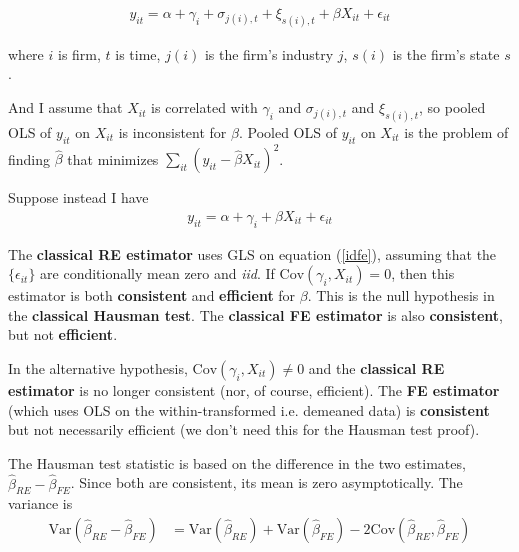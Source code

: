\documentclass[11pt,english]{article}
\begin{document}
	
	
	
\begin{align}
	y_{it} = \alpha + \gamma_i + \sigma_{j(i),t} + \xi_{s(i),t} + \beta X_{it} + \epsilon_{it}
\end{align}
	
where $i$ is firm, $t$ is time, $j(i)$ is the firm's industry $j$, $s(i)$ is the firm's state $s$. 	

And I assume that $X_{it}$ is correlated with $\gamma_i$ and $\sigma_{j(i),t}$ and $\xi_{s(i),t}$, so pooled OLS of $y_{it}$ on $X_{it}$ is inconsistent for $\beta$. Pooled OLS of $y_{it}$ on $X_{it}$ is the problem of finding $\hat{\beta}$ that minimizes $\sum_{it} (y_{it} - \hat{\beta} X_{it})^2$. 

Suppose instead I have
\begin{align}
	y_{it} = \alpha + \gamma_i + \beta X_{it}  + \epsilon_{it} \label{idfe}
\end{align}
	
The \textbf{classical RE estimator} uses GLS on equation (\ref{idfe}), assuming that the $\{ \epsilon_{it} \}$ are conditionally mean zero and \textit{iid}. If $\text{Cov}(\gamma_i ,X_{it}) = 0$, then this estimator is both \textbf{consistent} and \textbf{efficient} for $\beta$. This is the null hypothesis in the \textbf{classical Hausman test}. The \textbf{classical FE estimator} is also \textbf{consistent}, but not \textbf{efficient}. 

In the alternative hypothesis, $\text{Cov}(\gamma_i, X_{it}) \ne 0$ and the \textbf{classical RE estimator} is no longer consistent (nor, of course, efficient). The \textbf{FE estimator} (which uses OLS on the within-transformed i.e. demeaned data) is \textbf{consistent} but not necessarily efficient (we don't need this for the Hausman test proof). 

The Hausman test statistic is based on the difference in the two estimates, $\hat{\beta}_{RE} - \hat{\beta}_{FE}$. Since both are consistent, its mean is zero asymptotically. The variance is 
\begin{align}
	\text{Var}(\hat{\beta}_{RE} - \hat{\beta}_{FE}) &= \text{Var}(\hat{\beta}_{RE}) + \text{Var}(\hat{\beta}_{FE}) - 2\text{Cov}(\hat{\beta}_{RE}, \hat{\beta}_{FE})
\end{align}









	
	
	
	
	
	
	
\end{document}
